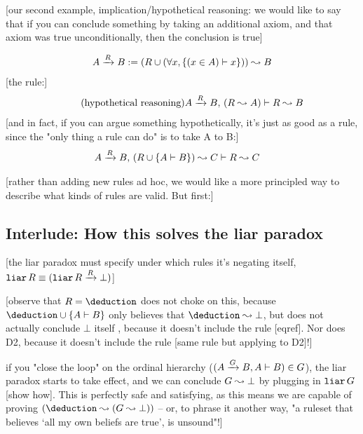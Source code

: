 \documentclass{article}
\begin{document}
  [our second example, implication/hypothetical reasoning: we would like to say that if you can conclude something by taking an additional axiom, and that axiom was true unconditionally, then the conclusion is true]
  
  \renewcommand{\implies}[1]{\xrightarrow{#1}}
  
  \begin{align*}
    A \implies{R} B := (R \union (\forall x, \singleton{(x \in A) \infrule x})) \concludes B\\
  \end{align*}
  [the rule:]
  \begin{align*}
    \tag{hypothetical reasoning}\label{hyp}
    \globalrule{A \implies{R} B \presep (R \concludes A)}{R \concludes B}\\
  \end{align*}
  [and in fact, if you can argue something hypothetically, it's just as good as a rule, since the "only thing a rule can do" is to take A to B:]
  \begin{align*}
    \globalrule{A \implies{R} B \presep (R \union \singleton{A \infrule B}) \concludes C}{R \concludes C}
  \end{align*}
  
  [rather than adding new rules ad hoc, we would like a more principled way to describe what kinds of rules are valid. But first:]
  
  \subsection{Interlude: How this solves the liar paradox}
  
  [the liar paradox must specify under which rules it's negating itself, $\name{liar}R \equiv (\name{liar}R \implies{R} \bot)$]
  
  [observe that $R = \deduction$ does not choke on this, because $\deduction \union \singleton{A \infrule B}$ only believes that $\deduction \concludes \bot$, but does not actually conclude $\bot$ itself , because it doesn't include the rule [eqref]. Nor does D2, because it doesn't include the rule [same rule but applying to D2]!]
  
   if you "close the loop" on the ordinal hierarchy ($(A \implies{G} B, A \infrule B) \in G$), the liar paradox starts to take effect, and we can conclude $G \leadsto \bot$ by plugging in $\operatorname{\texttt{liar}}G$ [show how]. This is perfectly safe and satisfying, as this means we are capable of proving $(\deduction \concludes (G \concludes \bot))$ – or, to phrase it another way, "a ruleset that believes `all my own beliefs are true', is unsound"!]
   
\end{document}
